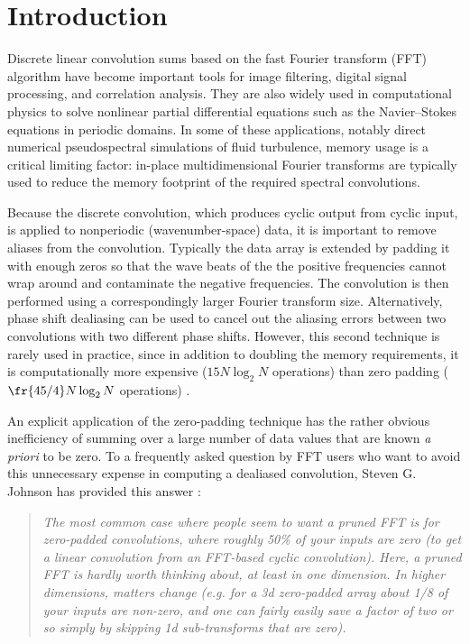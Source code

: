 \documentclass[final]{siamltex}
\begin{document}



\section{Introduction}
Discrete linear convolution sums based on the fast Fourier transform (FFT)
algorithm \cite{Gauss1866,Cooley65} have become important tools for image
filtering, digital signal
processing, and correlation analysis. They are also widely used in
computational physics to solve nonlinear partial differential equations
such as the Navier--Stokes equations in periodic domains. In some of these
applications, notably direct numerical pseudospectral simulations of fluid
turbulence, memory usage is a critical limiting factor: in-place
multidimensional Fourier transforms are typically used to reduce the memory
footprint of the required spectral convolutions.

Because the discrete convolution, which produces cyclic output from cyclic
input, is applied to nonperiodic (wavenumber-space) data, it is important
to remove aliases from the convolution. Typically the data array is
extended by padding it with enough zeros so that the wave beats of the
the positive frequencies cannot wrap around and contaminate
the negative frequencies. The convolution is then performed using a
correspondingly larger Fourier transform size. Alternatively, phase
shift dealiasing \cite{Patterson71,Canuto} can be used to cancel out the
aliasing errors between two convolutions with two different phase
shifts. However, this second technique is rarely used in practice, since in
addition to doubling the memory requirements, it is computationally more
expensive ($15N\log_2 N$ operations) than zero padding
($\fr{45/4}N\log_2 N$ operations) \cite[p.~136]{Canuto}. 

An explicit application of the zero-padding technique has the rather
obvious inefficiency of summing over a large number of data values that
are known {\it a priori\/} to be zero.
To a frequently asked question by FFT users who want to avoid this
unnecessary expense in computing a dealiased convolution,
Steven G. Johnson has provided this
answer \cite{http://www.fftw.org/pruned.html}:
\begin{quotation}
{\it
The most common case where people seem to want a pruned FFT is for
zero-padded convolutions, where roughly 50\% of your inputs are zero (to
get a linear convolution from an FFT-based cyclic convolution). Here, a
pruned FFT is hardly worth thinking about, at least in one dimension. In
higher dimensions, matters change (e.g. for a 3d zero-padded array about
1/8 of your inputs are non-zero, and one can fairly easily save a factor of
two or so simply by skipping 1d sub-transforms that are zero).
}
\end{quotation}
\end{document}
